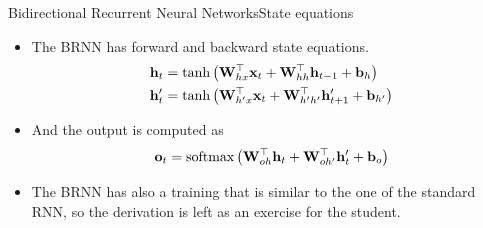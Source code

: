 \documentclass{beamer}
\begin{document}
\begin{frame}{Bidirectional Recurrent Neural Networks}{State equations}


\begin{itemize}
\item The BRNN has forward and backward state equations.
\begin{equation}\label{eq:BRNN_recursion} 
\begin{split}
{\bf h}_{t}&=\tanh\left( {\bf W}_{hx}^\top{\bf x}_{t} + {\bf W}_{hh}^\top{\bf h}_{t-1}+{\bf b}_{h}   \right)\\
{\bf h}'_{t}&=\tanh\left( {\bf W}_{h'x}^\top{\bf x}_{t} + {\bf W}_{h'h'}^\top{\bf h}'_{t+1}+{\bf b}_{h'}   \right)\\
\end{split}
\end{equation}
\item And the output is computed as
\begin{equation}\label{eq:BRNN_output} 
{{\bf o}_{t}}=\text{softmax}\left({\bf W}_{oh}^\top{\bf h}_{t} +{\bf W}_{oh'}^\top{\bf h}'_{t} + {\bf b}_{o}\right)
\end{equation}
\item The BRNN has also a training that is similar to the one of the standard RNN, so the derivation is left as an exercise for the student.
\end{itemize}

\end{frame}
\end{document}
